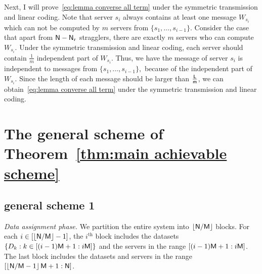 \documentclass[conference,letterpaper]{IEEEtran}
\begin{document}
Next, I will prove~\eqref{eq:lemma converse all term} under the symmetric transmission and linear coding. Note that server $s_i$ always contains at least one message $W_{s_i}$ which can not be computed by $m$ servers from $\{s_1, \ldots, s_{i-1}\}$.  Consider the case that apart from ${\sf N} - {\sf N}_{\rm r}$ stragglers, there are exactly $m$ servers who can compute $W_{s_i}$. Under the symmetric transmission and linear coding, each server should contain $\frac{1}{m}$ independent part of $W_{s_i}$. Thus, we have the message of server $s_i$ is independent to messages from $\{s_1, \ldots, s_{i-1}\},$ because of the independent part of $W_{s_i}$. Since the length of each message should be larger than $\frac{{\sf L}}{{\sf m}}$, we can obtain~\eqref{eq:lemma converse all term} under the symmetric transmission and linear coding. 

\section{The general scheme of Theorem~\ref{thm:main achievable scheme}}
\label{sec:general scheme} 
\subsection{general scheme 1}
\label{general scheme 1}
{\it Data assignment phase.}
We partition the entire system into $\left\lfloor  {\sf N}/{\sf M} \right\rfloor $ blocks. For each $i \in [\left\lfloor {\sf N}/{\sf M} \right\rfloor - 1]$, the $i^{\text{th}}$ block includes the datasets $\{ D_{k}: k \in \left[(i-1){\sf M}+1: i{\sf M} \right]\}$ and the servers in the range $\left[(i-1){\sf M}+1: i{\sf M} \right]$.
The last block includes the datasets and servers in the range $\left[\left\lfloor {\sf N}/{\sf M} - 1 \right\rfloor {\sf M} + 1 : {\sf N} \right]$.
\end{document}
